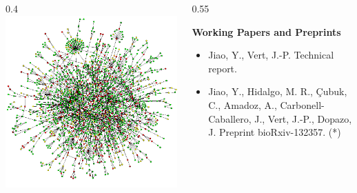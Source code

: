 \documentclass[xcolor=x11names,compress]{beamer}
\theoremstyle{plain}
\renewcommand{\(}{\begin{columns}}
\renewcommand{\)}{\end{columns}}
\newcommand{\<}[1]{\begin{column}{#1}}
\renewcommand{\>}{\end{column}}
\newcommand{\addsectiontitlepage}{
	\hfill\leavevmode
  \vtop{
    \huge\hbox{\color{myblue}\insertsection}
    \kern.5ex %
    \vspace{1cm}
  }
}
\begin{document}
\begin{frame}
	
	\addsectiontitlepage
	
	\(
	\<{0.4\linewidth}
	\includegraphics[width=\columnwidth]{slides/ppi}
	\>
	
	\<{0.55\linewidth}
	\begin{footnotesize}
	\textbf{Working Papers and Preprints}
	\begin{itemize}
		\item \nocite{Jiao2017Network} Jiao, Y., Vert, J.-P. Technical report.
		\item \nocite{Jiao2017Signaling} Jiao, Y., Hidalgo, M. R., \c{C}ubuk, C., Amadoz, A., Carbonell-Caballero, J., Vert, J.-P., Dopazo, J. Preprint bioRxiv-132357. (*)
	\end{itemize}
	\end{footnotesize}
	\>
	\)
	
\end{frame}
\end{document}
